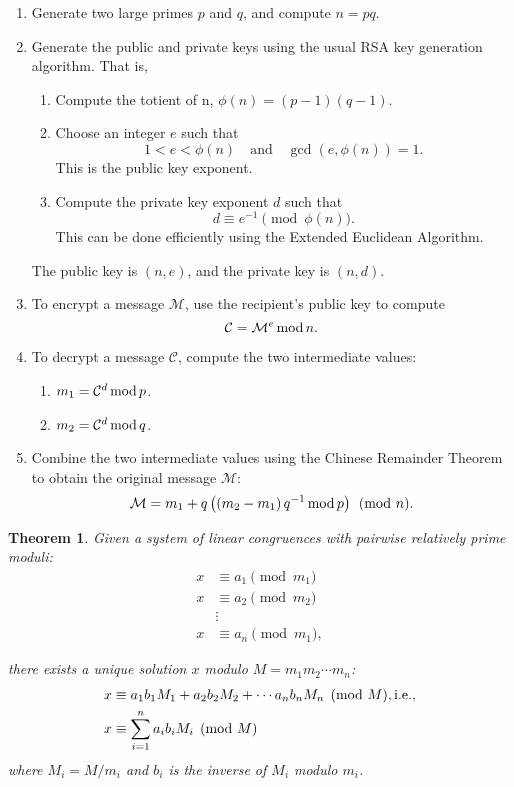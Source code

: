 \documentclass[12pt,openany]{book}
\newtheorem{theorem}{Theorem}[chapter]
\theoremstyle{definition}
\newcommand{\inv}[1]{#1^{-1}}
\newcommand{\ie}{\textnormal{i.e.}}
\newcommand{\of}[1]{\left( #1 \right)}
\renewcommand{\mod}{\operatorname{\textnormal{mod}}}
\begin{document}
	\begin{tcolorbox}[colback=white!10!white,colframe=blue!50!black,title=RSA-CRT Algorithm]
		\begin{enumerate}
			\item Generate two large primes $p$ and $q$, and compute $n = pq$.
			\item Generate the public and private keys using the usual RSA key generation algorithm. That is, \begin{enumerate}
				\item Compute the totient of n, $\phi(n) = (p - 1)(q - 1)$.
				\item Choose an integer $e$ such that \[
				1 < e < \phi(n)\quad \text{and}\quad \gcd(e, \phi(n)) = 1.
				\] This is the public key exponent.
				\item Compute the private key exponent $d$ such that \[
				d\equiv\inv{e} \pmod{\phi(n)}.
				\] This can be done efficiently using the Extended Euclidean Algorithm.
			\end{enumerate}
			The public key is $(n, e)$, and the private key is $(n, d)$.
			\item To encrypt a message $\mathcal{M}$, use the recipient's public key to compute \[
			\mathcal{C} = \mathcal{M}^e \mod{n}.
			\]
			\item To decrypt a message $\mathcal{C}$, compute the two intermediate values: \begin{enumerate}
				\item $m_1 = \mathcal{C}^d \mod p$.
				\item $m_2 = \mathcal{C}^d \mod q$.
			\end{enumerate}
			\item Combine the two intermediate values using the Chinese Remainder Theorem to obtain the original message $\mathcal{M}$: \[
			\mathcal{M} = m_1+q\of{\of{m_2-m_1}\inv{q}\mod p}\pmod{n}.
			\]
		\end{enumerate}
	\end{tcolorbox}
	
	\begin{tcolorbox}[title=Chinese Remainder Theorem]
		\begin{theorem}
			Given a system of linear congruences with pairwise relatively prime moduli:
			\begin{align*}
				x&\equiv a_1 \pmod{m_1}\\
				x&\equiv a_2 \pmod{m_2}\\
				&\vdots \\
				x&\equiv a_n \pmod{m_1},
			\end{align*}
			
			there exists a unique solution $x$ modulo $M = m_1m_2\cdots m_n$:
			\begin{align*}
				x&\equiv a_1b_1M_1+a_2b_2M_2+\cdots a_nb_nM_n\pmod{M}, \ie,\\ x&\equiv\sum_{i=1}^{n}a_ib_iM_i\pmod{M}
			\end{align*}\[
			\] where $M_i=M/m_i$ and $b_i$ is the inverse of $M_i$ modulo $m_i$.
		\end{theorem}
	\end{tcolorbox}
	
\end{document}
